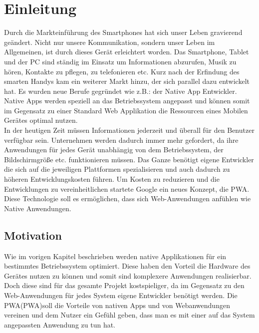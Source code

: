 \chapter{Einleitung}\label{chap:Einleitung}
\thispagestyle{standard}
\pagestyle{standard}
\renewcommand{\footrulewidth}{0.4pt}

Durch die Markteinführung des Smartphones hat sich unser Leben gravierend geändert. 
Nicht nur unsere Kommunikation, sondern unser Leben im Allgemeinen, ist durch dieses Gerät erleichtert worden.
Das Smartphone, Tablet und der PC sind ständig im Einsatz um Informationen abzurufen, Musik zu hören, Kontakte zu pflegen, zu telefonieren etc. Kurz nach der Erfindung des smarten Handys kam ein weiterer Markt 
hinzu, der sich parallel dazu entwickelt hat. Es wurden neue Berufe gegründet wie z.B.: der Native App Entwickler.
Native Apps werden speziell an das Betriebssystem angepasst und können somit im Gegensatz zu einer Standard Web Applikation die Ressourcen eines Mobilen Gerätes optimal nutzen.\\ In der heutigen Zeit müssen Informationen jederzeit und überall für den Benutzer verfügbar sein. Unternehmen werden dadurch immer mehr gefordert, da ihre Anwendungen für jedes Gerät unabhängig von dem Betriebssystem, der Bildschirmgröße etc. funktionieren müssen. Das Ganze benötigt eigene Entwickler die sich auf die jeweiligen Plattformen spezialisieren und auch dadurch zu höheren Entwicklungskosten führen. Um Kosten zu reduzieren und die Entwicklungen zu vereinheitlichen startete Google ein neues Konzept, die \acl{PWA}. 
Diese Technologie soll es ermöglichen, dass sich Web-Anwendungen anfühlen wie Native Anwendungen.   


\section{Motivation} \label{sub:Motivation}
Wie im vorigen Kapitel beschrieben werden native Applikationen für ein bestimmtes Betriebssystem optimiert. Diese haben den Vorteil die Hardware des Gerätes nutzen zu können und somit sind komplexere Anwendungen realisierbar. Doch diese sind für das gesamte Projekt kostspieliger, da im Gegensatz zu den Web-Anwendungen für jedes System eigene Entwickler benötigt werden.
Die \acl{PWA}(\acs{PWA})soll die Vorteile von nativen Apps und von Webanwendungen vereinen und dem Nutzer ein Gefühl geben, dass man es mit einer auf das System angepassten Anwendung zu tun hat.  




